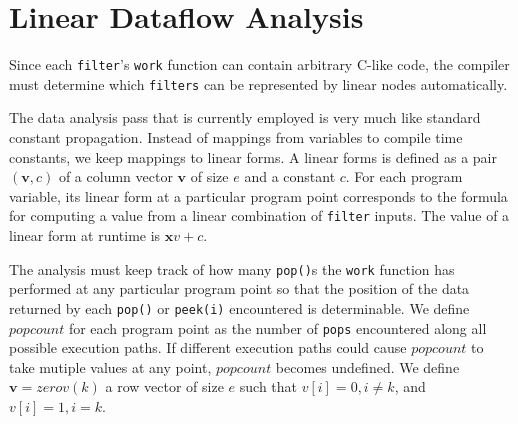 \section{Linear Dataflow Analysis}
%
%
%



Since each {\tt filter}'s {\tt work} function can contain arbitrary C-like code,
the compiler must determine which {\tt filters} can be represented by linear nodes
automatically. 
 
The data analysis pass that is currently employed is very much like standard constant propagation. 
Instead of mappings from variables to compile time constants, we keep mappings to linear forms.
A linear forms is defined as a pair $({\mathbf v}, c)$ of a column vector $\mathbf{v}$ of size $e$ 
and a constant $c$. For each program variable, its linear form at a particular program 
point corresponds to the formula for computing a value from a linear 
combination of {\tt filter} inputs. The value of a linear form at runtime is 
${\mathbf xv} + c$.


The analysis must keep track of how many {\tt pop()}s the {\tt work} 
function has performed at any particular program point so that 
the position of the data returned by each {\tt pop()} or {\tt peek(i)} 
encountered is determinable. We define $popcount$ for each program point 
as the number of {\tt pops} encountered along all possible
execution paths. If different execution paths could cause $popcount$ to take
mutiple values at any point, $popcount$ becomes undefined.
We define ${\mathbf v} = zerov(k)$ a row vector of size $e$ such that 
$v[i]=0, i \neq k$, and $v[i]=1,i=k$.


